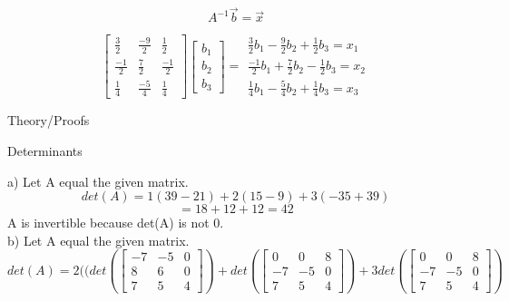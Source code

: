 \documentclass[12pt]{article}
\newcommand{\sqbrl}{\left[}
\newcommand{\sqbrr}{\right]}
\newenvironment{problem}[2][Problem]{\begin{trivlist}
\item[\hskip \labelsep {\bfseries #1}\hskip \labelsep {\bfseries #2.}]}{\end{trivlist}}
\begin{document}
\[A^{-1}\vec{b} = \vec{x}\]

\[\sqbrl\begin{matrix}\frac{3}{2} & \frac{-9}{2} & \frac{1}{2}\\\frac{-1}{2} & \frac{7}{2} & \frac{-1}{2}\\ \frac{1}{4} &\frac{-5}{4} & \frac{1}{4}\end{matrix}\sqbrr\sqbrl\begin{matrix}b_1\\b_2\\b_3\end{matrix}\sqbrr = \begin{matrix}\frac{3}{2}b_1 - \frac{9}{2}b_2 + \frac{1}{2}b_3 = x_1\\
\frac{-1}{2}b_1 + \frac{7}{2}b_2 - \frac{1}{2}b_3 = x_2\\
\frac{1}{4}b_1 - \frac{5}{4}b_2 + \frac{1}{4}b_3 = x_3\end{matrix}\]


\begin{problem}{3}
	Theory/Proofs
\end{problem}


\begin{problem}{4}
\end{problem}


\begin{problem}{5}
\end{problem}


\begin{problem}{6}
	Determinants
\end{problem}
a) Let A equal the given matrix.\\
\[det(A) = 1(39 - 21) + 2(15-9) + 3(-35 + 39)\]
\[= 18 + 12 + 12 = 42\]
A is invertible because det(A) is not 0.\\

b) Let A equal the given matrix.\\
\[det(A) = 2((det\left(\sqbrl\begin{matrix}-7 & -5 & 0\\8 & 6 & 0\\ 7 & 5 & 4\end{matrix}\sqbrr\right)
			+ det\left(\sqbrl\begin{matrix} 0 & 0 & 8\\-7&-5&0\\7&5&4\end{matrix}\sqbrr\right)
			+ 3det\left(\sqbrl\begin{matrix}0 & 0 & 8\\-7 & -5 & 0\\7&5&4\end{matrix}\sqbrr\right)\]
\end{document}

